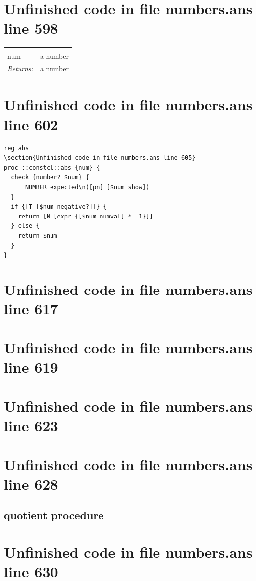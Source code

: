 \documentclass[twoside,9pt]{report}
\begin{document}
\section{Unfinished code in file numbers.ans line 598}
\noindent\begin{tabular}{ |p{1.9cm} p{8cm}| }
\hline
\rowcolor[HTML]{CCCCCC} \multicolumn{2}{|l|}{\bf abs (public)} \\
num & a number \\
\textit{Returns:} & a number \\
\hline
\end{tabular}
\section{Unfinished code in file numbers.ans line 602}
\begin{lstlisting}
reg abs
\section{Unfinished code in file numbers.ans line 605}
proc ::constcl::abs {num} {
  check {number? $num} {
      NUMBER expected\n([pn] [$num show])
  }
  if {[T [$num negative?]]} {
    return [N [expr {[$num numval] * -1}]]
  } else {
    return $num
  }
}
\end{lstlisting}
\section{Unfinished code in file numbers.ans line 617}
\section{Unfinished code in file numbers.ans line 619}
\section{Unfinished code in file numbers.ans line 623}
\section{Unfinished code in file numbers.ans line 628}
\subsection{quotient procedure}
\label{quotient-procedure}
\section{Unfinished code in file numbers.ans line 630}
\end{document}
